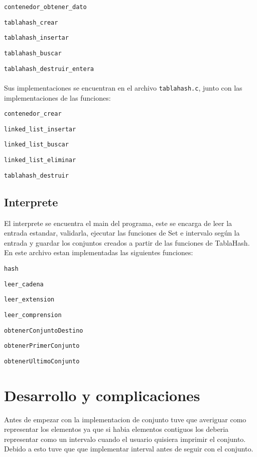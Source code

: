 \documentclass[]{article}
\begin{document}
\verb|contenedor_obtener_dato|

\verb|tablahash_crear|

\verb|tablahash_insertar|

\verb|tablahash_buscar|

\verb|tablahash_destruir_entera|\\\\
Sus implementaciones se encuentran en el archivo \verb|tablahash.c|, junto con las implementaciones de las funciones:

\verb|contenedor_crear|

\verb|linked_list_insertar|

\verb|linked_list_buscar|

\verb|linked_list_eliminar|

\verb|tablahash_destruir|

\subsection{Interprete}
El interprete se encuentra el main del programa, este se encarga de leer la entrada estandar, validarla, ejecutar las funciones de Set e intervalo según la entrada y guardar los conjuntos creados a partir de las funciones de TablaHash. En este archivo estan implementadas las siguientes funciones:

\verb|hash|

\verb|leer_cadena|

\verb|leer_extension|

\verb|leer_comprension|

\verb|obtenerConjuntoDestino|

\verb|obtenerPrimerConjunto|

\verb|obtenerUltimoConjunto|

\section{Desarrollo y complicaciones}
Antes de empezar con la implementacion de conjunto tuve que averiguar como representar los elementos ya que si habia elementos contiguos los deberia representar como un intervalo cuando el usuario quisiera imprimir el conjunto. Debido a esto tuve que que implementar interval antes de seguir con el conjunto. 
\end{document}
